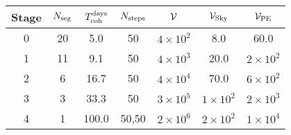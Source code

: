 \begin{tabular}{c|cccccc}
Stage & $N_{\rm seg}$ & $T_{\rm coh}^{\rm days}$ &$N_{\rm steps}$ & $\mathcal{V}$ & $\mathcal{V}_{\rm Sky}$ & $\mathcal{V}_{\rm PE}$ \\ \hline
0 & 20 & 5.0 & 50 & $4{\times}10^{2}$ & 8.0 & 60.0 \\
1 & 11 & 9.1 & 50 & $4{\times}10^{3}$ & 20.0 & $2{\times}10^{2}$ \\
2 & 6 & 16.7 & 50 & $4{\times}10^{4}$ & 70.0 & $6{\times}10^{2}$ \\
3 & 3 & 33.3 & 50 & $3{\times}10^{5}$ & $1{\times}10^{2}$ & $2{\times}10^{3}$ \\
4 & 1 & 100.0 & 50,50 & $2{\times}10^{6}$ & $2{\times}10^{2}$ & $1{\times}10^{4}$ \\
\end{tabular}

